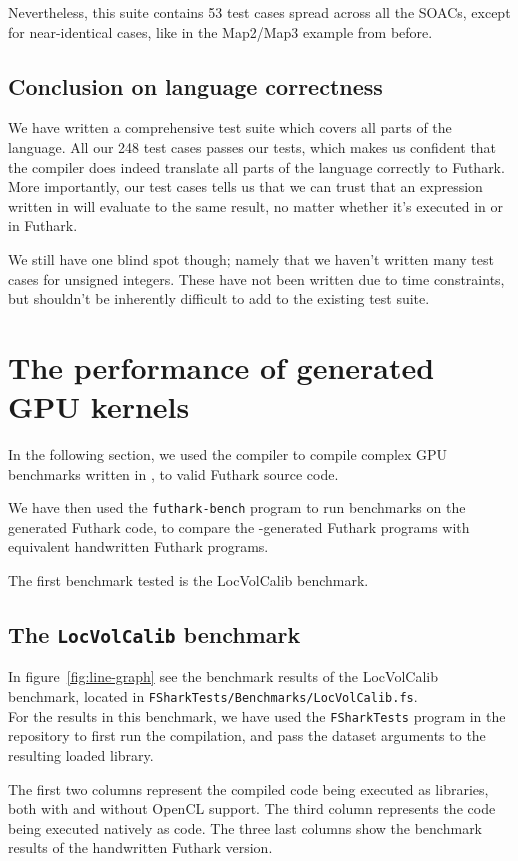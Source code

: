 Nevertheless, this suite contains 53 test cases spread across all the SOACs, except for near-identical cases, like in the Map2/Map3 example from before.

\subsection{Conclusion on \fshark{} language correctness}
We have written a comprehensive test suite which covers all parts of the \fshark{}
language. All our 248 test cases passes our tests, which makes us confident that
the \fshark{} compiler does indeed translate all parts of the \fshark{} language
correctly to Futhark.
More importantly, our test cases tells us that we can trust that an expression
written in \fshark{} will evaluate to the same result, no matter whether it's
executed in \fsharp{} or in Futhark.

We still have one blind spot though; namely that we haven't written many test
cases for unsigned integers.
These have not been written due to time constraints, but shouldn't be inherently
difficult to add to the existing test suite.

\section{The performance of \fshark{} generated GPU kernels}
\label{sec:fsharkgpubenchmarks}
In the following section, we used the \fshark{} compiler to compile complex GPU
benchmarks written in \fshark{}, to valid Futhark source code.

We have then used the \texttt{futhark-bench} program to run benchmarks on the
\fshark{} generated Futhark code, to compare the \fshark{}-generated Futhark
programs with equivalent handwritten Futhark programs.

The first benchmark tested is the LocVolCalib benchmark.
\subsection{The \texttt{LocVolCalib} benchmark}
In figure~\ref{fig:line-graph}  see the benchmark results of the LocVolCalib benchmark, located in \texttt{FSharkTests/Benchmarks/LocVolCalib.fs}.\\
For the \fsharp{} results in this benchmark, we have used the \texttt{FSharkTests} program in the
\fshark{} repository to first run the compilation, and pass the dataset
arguments to the resulting loaded library.

The first two columns represent the compiled \fshark{} code being executed as
\csharp{} libraries, both with and without OpenCL support.
The third column represents the \fshark{} code being executed natively as
\fsharp{} code.
The three last columns show the benchmark results of the handwritten Futhark
version.

